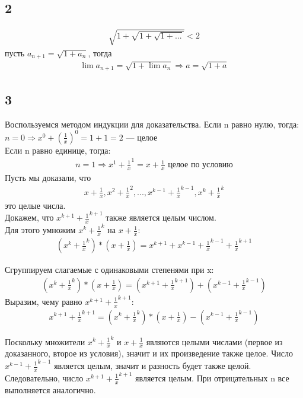 		\subsection{2}
		\begin{gather*}
		\sqrt{1 +\sqrt{1 + \sqrt{1 + ...}}} < 2
		\end{gather*}
		пусть $a_{n+1} = \sqrt{1 + a_n}$, тогда
		\begin{gather*}
		\lim a_{n+1} = \sqrt{1 + \lim a_n} \Longrightarrow a = \sqrt{1 + a}
		\end{gather*}
		
		\subsection{3}
		Воспользуемся методом индукции для доказательства. Если n равно нулю, тогда:
		$n = 0 \Longrightarrow x^0 + (\frac{1}{x})^0 = 1 + 1 = 2$ — целое \\
		Если n равно единице, тогда:
			\begin{gather*}
			n = 1 \Longrightarrow x^1 + \frac{1}{x}^1 = x + \frac{1}{x} \text{	   целое по условию}
			\end{gather*}
		Пусть мы доказали, что 
			\begin{gather*} 
			x + \frac{1}{x}, x^2 + \frac{1}{x}^2, ..., x^{k-1} + \frac{1}{x}^{k-1}, x^k + \frac{1}{x}^k
			\end{gather*}
		это целые числа.\\
		Докажем, что $x^{k+1} + \frac{1}{x}^{k+1}$ также является целым числом. \\Для этого умножим $x^k + \frac{1}{x}^k$ на $x + \frac{1}{x}$: 
			\begin{gather*}
		 	(x^k + \frac{1}{x}^k)*(x + \frac{1}{x}) = x^{k+1} + x^{k-1} + \frac{1}{x}^{k-1} + \frac{1}{x}^{k+1} 
			 \end{gather*}
		 
		Сгруппируем слагаемые с одинаковыми степенями при x: 
		 	\begin{gather*}
			 (x^k + \frac{1}{x}^k)*(x + \frac{1}{x}) = (x^{k+1} + \frac{1}{x}^{k+1}) + (x^{k-1} + \frac{1}{x}^{k-1})
			 \end{gather*}
		Выразим, чему равно $x^{k+1} + \frac{1}{x}^{k+1}$:
			\begin{gather*}
		 	x^{k+1} + \frac{1}{x}^{k+1} = (x^k + \frac{1}{x}^k)*(x + \frac{1}{x}) - (x^{k-1} + \frac{1}{x}^{k-1})
			\end{gather*}
		 
		Поскольку множители $x^k + \frac{1}{x}^k$ и $x + \frac{1}{x}$ являются целыми числами (первое из доказанного, второе из условия), значит и их произведение также целое. Число $x^{k-1} + \frac{1}{x}^{k-1}$ является целым, значит и разность будет также целой. 		
		Следовательно, число $x^{k+1} + \frac{1}{x}^{k+1}$ является целым. При отрицательных n все выполняется аналогично.
		
